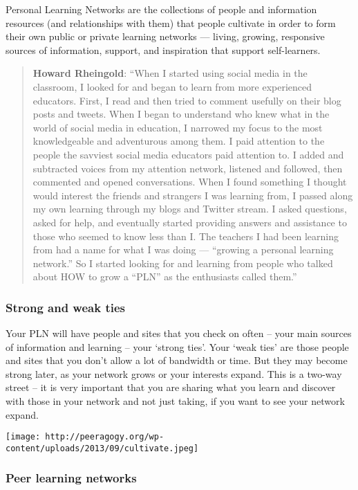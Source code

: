 Personal Learning Networks are the collections of people and information
resources (and relationships with them) that people cultivate in order
to form their own public or private learning networks --- living,
growing, responsive sources of information, support, and inspiration
that support self-learners.

\begin{quote}
\textbf{Howard Rheingold}: ``When I started using social media in the
classroom, I looked for and began to learn from more experienced
educators. First, I read and then tried to comment usefully on their
blog posts and tweets. When I began to understand who knew what in the
world of social media in education, I narrowed my focus to the most
knowledgeable and adventurous among them. I paid attention to the people
the savviest social media educators paid attention to. I added and
subtracted voices from my attention network, listened and followed, then
commented and opened conversations. When I found something I thought
would interest the friends and strangers I was learning from, I passed
along my own learning through my blogs and Twitter stream. I asked
questions, asked for help, and eventually started providing answers and
assistance to those who seemed to know less than I. The teachers I had
been learning from had a name for what I was doing --- ``growing a
personal learning network.'' So I started looking for and learning from
people who talked about HOW to grow a ``PLN'' as the enthusiasts called
them.''
\end{quote}

\subsubsection{Strong and weak ties}

Your PLN will have people and sites that you check on often -- your main
sources of information and learning -- your `strong ties'. Your `weak
ties' are those people and sites that you don't allow a lot of bandwidth
or time. But they may become strong later, as your network grows or your
interests expand. This is a two-way street -- it is very important that
you are sharing what you learn and discover with those in your network
and not just taking, if you want to see your network expand.

\texttt{[image: http://peeragogy.org/wp-content/uploads/2013/09/cultivate.jpeg]}

\subsubsection{Peer learning networks}

